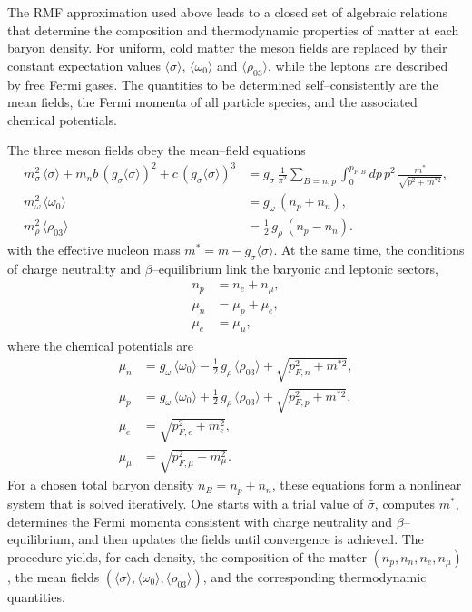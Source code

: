 The RMF approximation used above leads to a closed set of
algebraic relations that determine the composition and thermodynamic properties
of matter at each baryon density.  For uniform, cold matter the meson fields are
replaced by their constant expectation values $\langle\sigma\rangle$, $\langle\omega_{0}\rangle$ and
$\langle\rho_{03}\rangle$, while the leptons are described by free Fermi gases.  The
quantities to be determined self–consistently are the mean fields, the Fermi
momenta of all particle species, and the associated chemical potentials.

The three meson fields obey the mean–field equations
\begin{align}
m_{\sigma}^{2}\,\langle\sigma\rangle
+ m_{n}b\,(g_{\sigma}\langle\sigma\rangle)^{2}
+ c\,(g_{\sigma}\langle\sigma\rangle)^{3}
&= g_{\sigma}\,
   \frac{1}{\pi^{2}}\sum_{B=n,p}
   \int_{0}^{p_{F,B}}\!dp\,p^{2}\,
   \frac{m^{*}}{\sqrt{p^{2}+m^{*2}}},
\\[0.5em]
m_{\omega}^{2}\,\langle\omega_{0}\rangle
&= g_{\omega}\,(n_{p}+n_{n}),
\\[0.5em]
m_{\rho}^{2}\,\langle\rho_{03}\rangle
&= \tfrac{1}{2}\,g_{\rho}\,(n_{p}-n_{n}).
\end{align}
with the effective nucleon mass $m^{*}=m-g_{\sigma}\langle\sigma\rangle$.  At the same
time, the conditions of charge neutrality and $\beta$–equilibrium link the
baryonic and leptonic sectors,
\begin{align}
n_{p} &= n_{e} + n_{\mu},\\
\mu_{n} &= \mu_{p} + \mu_{e},\\
\mu_{e} &= \mu_{\mu},
\end{align}
where the chemical potentials are
\begin{align}
\mu_{n} &= g_{\omega}\,\langle\omega_{0}\rangle
          - \tfrac{1}{2}\,g_{\rho}\,\langle\rho_{03}\rangle
          + \sqrt{p_{F,n}^{2}+m^{*2}},\\[0.4em]
\mu_{p} &= g_{\omega}\,\langle\omega_{0}\rangle
          + \tfrac{1}{2}\,g_{\rho}\,\langle\rho_{03}\rangle
          + \sqrt{p_{F,p}^{2}+m^{*2}},\\[0.4em]
\mu_{e} &= \sqrt{p_{F,e}^{2}+m_{e}^{2}},\\[0.4em]
\mu_{\mu} &= \sqrt{p_{F,\mu}^{2}+m_{\mu}^{2}}.
\end{align}
For a chosen total baryon density $n_{B}=n_{p}+n_{n}$, these equations form a
nonlinear system that is solved iteratively.  One starts with a trial value of
$\bar\sigma$, computes $m^{*}$, determines the Fermi momenta consistent with
charge neutrality and $\beta$–equilibrium, and then updates the fields until
convergence is achieved.  The procedure yields, for each density, the
composition of the matter $(n_{p},n_{n},n_{e},n_{\mu})$, the mean fields
$(\langle\sigma\rangle,\langle\omega_{0}\rangle,\langle\rho_{03}\rangle)$, and the corresponding thermodynamic
quantities.

